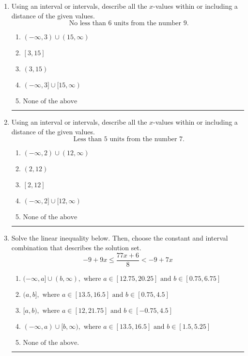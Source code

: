 \documentclass[14pt]{extbook}
\newcommand{\litem}[1]{\item#1\hspace*{-1cm}\rule{\textwidth}{0.4pt}}
\begin{document}
\begin{enumerate}
\litem{
Using an interval or intervals, describe all the $x$-values within or including a distance of the given values.\[ \text{ No less than } 6 \text{ units from the number } 9. \]\begin{enumerate}[label=\Alph*.]
\item \( (-\infty, 3) \cup (15, \infty) \)
\item \( [3, 15] \)
\item \( (3, 15) \)
\item \( (-\infty, 3] \cup [15, \infty) \)
\item \( \text{None of the above} \)

\end{enumerate} }
\litem{
Using an interval or intervals, describe all the $x$-values within or including a distance of the given values.\[ \text{ Less than } 5 \text{ units from the number } 7. \]\begin{enumerate}[label=\Alph*.]
\item \( (-\infty, 2) \cup (12, \infty) \)
\item \( (2, 12) \)
\item \( [2, 12] \)
\item \( (-\infty, 2] \cup [12, \infty) \)
\item \( \text{None of the above} \)

\end{enumerate} }
\litem{
Solve the linear inequality below. Then, choose the constant and interval combination that describes the solution set.\[ -9 + 9 x \leq \frac{77 x + 6}{8} < -9 + 7 x \]\begin{enumerate}[label=\Alph*.]
\item \( (-\infty, a] \cup (b, \infty), \text{ where } a \in [12.75, 20.25] \text{ and } b \in [0.75, 6.75] \)
\item \( (a, b], \text{ where } a \in [13.5, 16.5] \text{ and } b \in [0.75, 4.5] \)
\item \( [a, b), \text{ where } a \in [12, 21.75] \text{ and } b \in [-0.75, 4.5] \)
\item \( (-\infty, a) \cup [b, \infty), \text{ where } a \in [13.5, 16.5] \text{ and } b \in [1.5, 5.25] \)
\item \( \text{None of the above.} \)


\end{enumerate}}
\end{enumerate}
\end{document}
